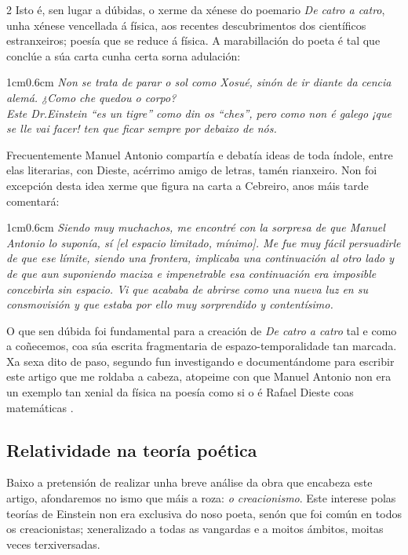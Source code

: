 \begin{multicols}{2}
Isto é, sen lugar a dúbidas, o xerme da xénese do poemario \textit{De catro a
catro}, unha xénese vencellada á física, aos recentes descubrimentos dos
científicos estranxeiros; poesía que se reduce á física. A marabillación do
poeta é tal que conclúe a súa carta cunha certa sorna adulación:

\begin{adjustwidth}{1cm}{0.6cm}
    \textit{Non se trata de parar o sol como Xosué, sinón de ir diante da cencia
    alemá. ¿Como che quedou o corpo?\\ Este Dr.Einstein ``es un tigre'' como din os
    ``ches'', pero como non é galego ¡que se lle vai facer! ten que ficar sempre
    por debaixo de nós.\cite{d4a4}}
\end{adjustwidth}

Frecuentemente Manuel Antonio compartía e debatía ideas de toda índole, entre
elas literarias, con Dieste, acérrimo amigo de letras, tamén rianxeiro. Non foi
excepción desta idea xerme que figura na carta a Cebreiro, anos máis tarde
comentará:

\begin{adjustwidth}{1cm}{0.6cm}
    \textit{Siendo muy muchachos, me encontré con la sorpresa de que Manuel Antonio
    lo suponía, sí [el espacio limitado, mínimo]. Me fue muy fácil persuadirle de
    que ese límite, siendo una frontera, implicaba una continuación al otro lado y
    de que aun suponiendo maciza e impenetrable esa continuación era imposible
    concebirla sin espacio. Vi que acababa de abrirse como una nueva luz en su
    consmovisión y que estaba por ello muy sorprendido y contentísimo.\cite{d4a4}}
\end{adjustwidth}

O que sen dúbida foi fundamental para a creación de \textit{De catro a catro}
tal e como a coñecemos, coa súa escrita fragmentaria de espazo-temporalidade
tan marcada. Xa sexa dito de paso, segundo fun investigando e documentándome
para escribir este artigo que me roldaba a cabeza, atopeime con que Manuel
Antonio non era un exemplo tan xenial da física na poesía como si o é Rafael
Dieste coas matemáticas \cite{dieste_xeometria}.

\subsection*{Relatividade na teoría poética}

Baixo a pretensión de realizar unha breve análise da obra que encabeza este
artigo, afondaremos no ismo que máis a roza: \textit{o creacionismo}. Este
interese polas teorías de Einstein non era exclusiva do noso poeta, senón que
foi común en todos os creacionistas; xeneralizado a todas as vangardas e a
moitos ámbitos, moitas veces terxiversadas.


\end{multicols}
